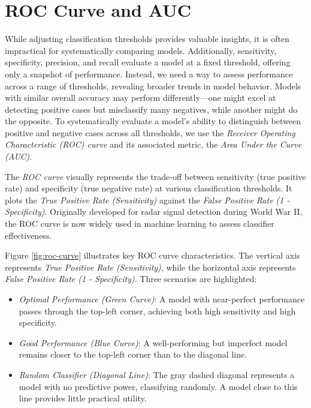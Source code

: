 \documentclass[
]{book}
\providecommand{\tightlist}{%
  \setlength{\itemsep}{0pt}\setlength{\parskip}{0pt}}
\theoremstyle{definition}
\theoremstyle{definition}
\theoremstyle{definition}
\theoremstyle{definition}
\theoremstyle{remark}
\begin{document}
\section{ROC Curve and AUC}\label{roc-curve-and-auc}

While adjusting classification thresholds provides valuable insights, it is often impractical for systematically comparing models. Additionally, sensitivity, specificity, precision, and recall evaluate a model at a fixed threshold, offering only a snapshot of performance. Instead, we need a way to assess performance across a range of thresholds, revealing broader trends in model behavior. Models with similar overall accuracy may perform differently---one might excel at detecting positive cases but misclassify many negatives, while another might do the opposite. To systematically evaluate a model's ability to distinguish between positive and negative cases across all thresholds, we use the \emph{Receiver Operating Characteristic (ROC) curve} and its associated metric, the \emph{Area Under the Curve (AUC)}.

The \emph{ROC curve} visually represents the trade-off between sensitivity (true positive rate) and specificity (true negative rate) at various classification thresholds. It plots the \emph{True Positive Rate (Sensitivity)} against the \emph{False Positive Rate (1 - Specificity)}. Originally developed for radar signal detection during World War II, the ROC curve is now widely used in machine learning to assess classifier effectiveness.

Figure \ref{fig:roc-curve} illustrates key ROC curve characteristics. The vertical axis represents \emph{True Positive Rate (Sensitivity)}, while the horizontal axis represents \emph{False Positive Rate (1 - Specificity)}. Three scenarios are highlighted:

\begin{itemize}
\tightlist
\item
  \emph{Optimal Performance (Green Curve)}: A model with near-perfect performance passes through the top-left corner, achieving both high sensitivity and high specificity.\\
\item
  \emph{Good Performance (Blue Curve)}: A well-performing but imperfect model remains closer to the top-left corner than to the diagonal line.\\
\item
  \emph{Random Classifier (Diagonal Line)}: The gray dashed diagonal represents a model with no predictive power, classifying randomly. A model close to this line provides little practical utility.
\end{itemize}
\end{document}
